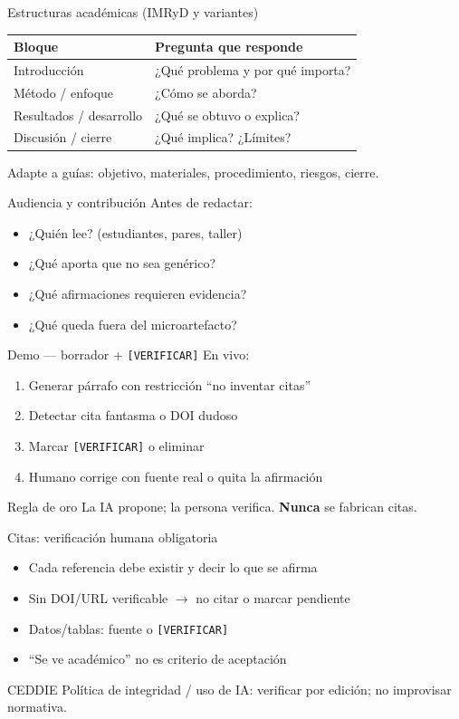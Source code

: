 \documentclass[aspectratio=169,11pt]{beamer}
\begin{document}
\begin{frame}{Estructuras académicas (IMRyD y variantes)}
\begin{tabularx}{\textwidth}{@{}lX@{}}
\toprule
Bloque & Pregunta que responde \\
\midrule
Introducción & ¿Qué problema y por qué importa? \\
Método / enfoque & ¿Cómo se aborda? \\
Resultados / desarrollo & ¿Qué se obtuvo o explica? \\
Discusión / cierre & ¿Qué implica? ¿Límites? \\
\bottomrule
\end{tabularx}
\vspace{0.5em}
Adapte a guías: objetivo, materiales, procedimiento, riesgos, cierre.
\end{frame}

\begin{frame}{Audiencia y contribución}
Antes de redactar:
\begin{itemize}
\item ¿Quién lee? (estudiantes, pares, taller)
\item ¿Qué aporta que no sea genérico?
\item ¿Qué afirmaciones requieren evidencia?
\item ¿Qué queda fuera del microartefacto?
\end{itemize}
\end{frame}

\begin{frame}{Demo --- borrador + \texttt{[VERIFICAR]}}
En vivo:
\begin{enumerate}
\item Generar párrafo con restricción ``no inventar citas''
\item Detectar cita fantasma o DOI dudoso
\item Marcar \texttt{[VERIFICAR]} o eliminar
\item Humano corrige con fuente real o quita la afirmación
\end{enumerate}
\begin{alertblock}{Regla de oro}
La IA propone; la persona verifica. \textbf{Nunca} se fabrican citas.
\end{alertblock}
\end{frame}

\begin{frame}{Citas: verificación humana obligatoria}
\begin{itemize}
\item Cada referencia debe existir y decir lo que se afirma
\item Sin DOI/URL verificable $\rightarrow$ no citar o marcar pendiente
\item Datos/tablas: fuente o \texttt{[VERIFICAR]}
\item ``Se ve académico'' no es criterio de aceptación
\end{itemize}
\begin{block}{CEDDIE}
Política de integridad / uso de IA: verificar por edición; no improvisar normativa.
\end{block}
\end{frame}
\end{document}
